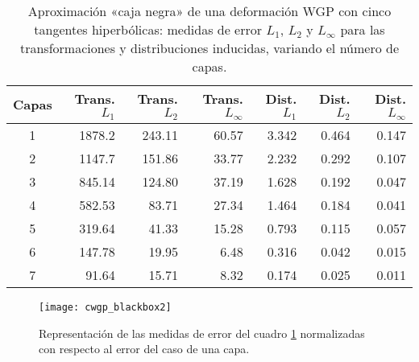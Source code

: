 \setlength{\tabcolsep}{4.4pt}
\begin{table}[h]
	\centering
	\begin{tabular}{crrrrrr}
		\toprule
		Capas	& Trans. \(L_1\)	& Trans. \(L_2\)	& Trans. \(L_\infty\)	& Dist. \(L_1\)	& Dist. \(L_2\)	& Dist. \(L_\infty\) \\
		\midrule
		1		& 1878.2			& 243.11			& 60.57					& 3.342			& 0.464			& 0.147 \\
		2		& 1147.7			& 151.86			& 33.77					& 2.232			& 0.292			& 0.107 \\
		3		&  845.14			& 124.80			& 37.19					& 1.628			& 0.192			& 0.047 \\
		4		&  582.53			&  83.71			& 27.34					& 1.464			& 0.184			& 0.041 \\
		5		&  319.64			&  41.33			& 15.28					& 0.793			& 0.115			& 0.057 \\
		6		&  147.78			&  19.95			&  6.48					& 0.316			& 0.042			& 0.015 \\
		7		&   91.64			&  15.71			&  8.32					& 0.174			& 0.025			& 0.011 \\
		\bottomrule
	\end{tabular}
	\caption{Aproximación «caja negra» de una deformación WGP con cinco tangentes hiperbólicas: medidas de error \(L_1\), \(L_2\) y \(L_\infty\) para las transformaciones y distribuciones inducidas, variando el número de capas.}
	\label{tab:table_blackbox} 
\end{table}

\begin{figure}[h]
	\centering
	\texttt{[image: cwgp\_blackbox2]}\\
	\caption{Representación de las medidas de error del cuadro \ref{tab:table_blackbox} normalizadas con respecto al error del caso de una capa.}
	\label{fig:cwgp_blackbox2}
\end{figure}


